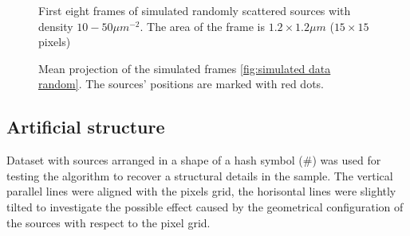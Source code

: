 \begin{figure}[!htb]	
	\newcommand{\widthfig}{1\textwidth}
	\centering	
	
	
	\caption{First eight frames of simulated randomly scattered sources with density $10-50\unit{\mu m^{-2}}$. The area of the frame is $1.2\times1.2\unit{\mu m}$ ($15\times15$ pixels)}
	\label{fig:simulated data random}
\end{figure} 
%
\begin{figure}[!htb]	
	\newcommand{\widthfig}{.25\textwidth}
	\centering	
	\hspace{.3cm}	
	\hspace{.3cm}	
	\caption{Mean projection of the simulated frames \autoref{fig:simulated data random}. The sources' positions are marked with red dots.}
	\label{fig:simulated data random - mean}
\end{figure} 

\clearpage
\subsection{Artificial structure\label{sub:Simul hash}}
Dataset with sources arranged in a shape of a hash symbol (\#) was used for testing the algorithm to recover a structural details in the sample. The vertical parallel lines were aligned with the pixels grid, the horisontal lines were slightly tilted to investigate the possible effect caused by the geometrical configuration of the sources with respect to the pixel grid. 

